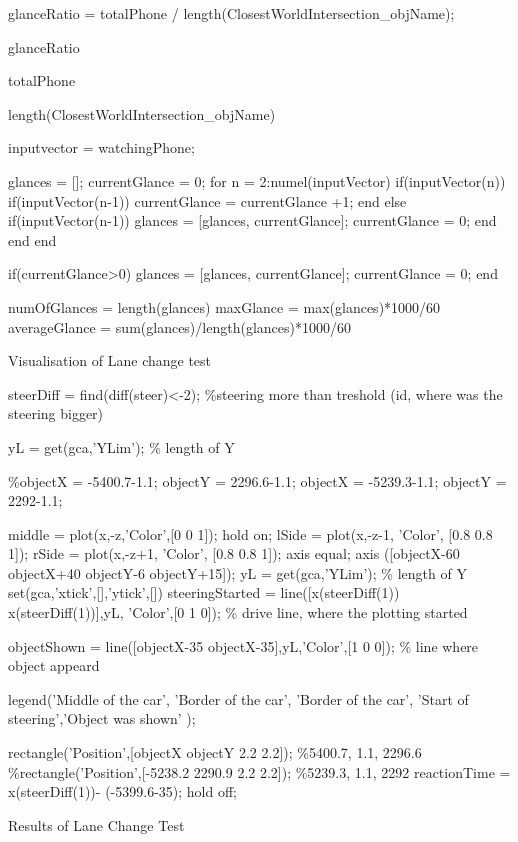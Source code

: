 glanceRatio = totalPhone / length(ClosestWorldIntersection_objName);

glanceRatio

totalPhone

length(ClosestWorldIntersection_objName)

inputvector = watchingPhone;

glances = [];
currentGlance = 0;
for n = 2:numel(inputVector)
    if(inputVector(n))
        if(inputVector(n-1))
            currentGlance = currentGlance +1;
        end
    else
        if(inputVector(n-1))
            glances = [glances, currentGlance];
            currentGlance = 0;
        end
    end
end


if(currentGlance>0)
    glances = [glances, currentGlance];
    currentGlance = 0;
end

numOfGlances = length(glances)
maxGlance = max(glances)*1000/60
averageGlance = sum(glances)/length(glances)*1000/60
\endtt

\secc Visualisation of Lane change test

\begtt

steerDiff = find(diff(steer)<-2); 
\%steering more than treshold (id, where was the steering bigger)

yL = get(gca,'YLim'); \% length of Y

\%objectX = -5400.7-1.1; objectY = 2296.6-1.1;
objectX = -5239.3-1.1;  objectY = 2292-1.1;

middle = plot(x,-z,'Color',[0 0 1]);
hold on;
lSide = plot(x,-z-1, 'Color', [0.8 0.8 1]);
rSide = plot(x,-z+1, 'Color', [0.8 0.8 1]);
axis equal;
axis ([objectX-60 objectX+40 objectY-6 objectY+15]);
yL = get(gca,'YLim'); \% length of Y
set(gca,'xtick',[],'ytick',[])
steeringStarted = line([x(steerDiff(1)) x(steerDiff(1))],yL,
						'Color',[0 1 0]); 
\% drive line, where the plotting started

objectShown = line([objectX-35 objectX-35],yL,'Color',[1 0 0]); 
\% line where object appeard


legend('Middle of the car', 'Border of the car', 
'Border of the car', 'Start of steering','Object was shown'  );



rectangle('Position',[objectX objectY 2.2 2.2]); \%5400.7, 1.1, 2296.6
\%rectangle('Position',[-5238.2 2290.9 2.2 2.2]); \%5239.3, 1.1, 2292
reactionTime = x(steerDiff(1))- (-5399.6-35);
hold off;

\endtt

\sec Results of Lane Change Test

